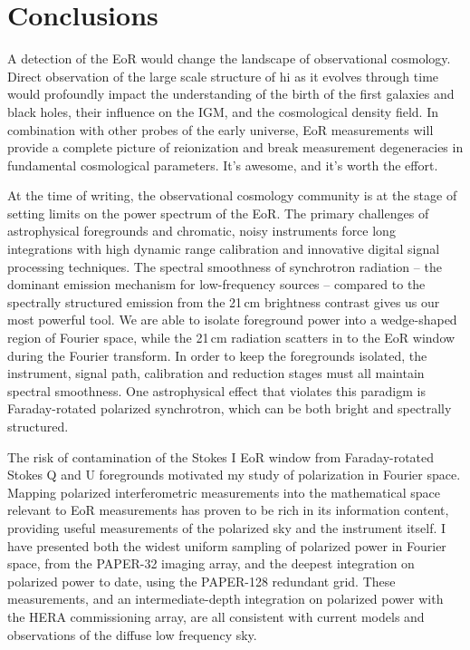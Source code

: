 \chapter{Conclusions}
\label{chapter:conc}

A detection of the EoR would change the landscape of observational cosmology. Direct observation of the large scale structure of {\sc hi} as it evolves through time would profoundly impact the understanding of the birth of the first galaxies and black holes, their influence on the IGM, and the cosmological density field. In combination with other probes of the early universe, EoR measurements will provide a complete picture of reionization and break measurement degeneracies in fundamental cosmological parameters. It's awesome, and it's worth the effort.

At the time of writing, the observational cosmology community is at the stage of setting limits on the power spectrum of the EoR. The primary challenges of astrophysical foregrounds and chromatic, noisy instruments force long integrations with high dynamic range calibration and innovative digital signal processing techniques. The spectral smoothness of synchrotron radiation -- the dominant emission mechanism for low-frequency sources -- compared to the spectrally structured emission from the 21\,cm brightness contrast gives us our most powerful tool. We are able to isolate foreground power into a wedge-shaped region of Fourier space, while the 21\,cm radiation scatters in to the EoR window during the Fourier transform. In order to keep the foregrounds isolated, the instrument, signal path, calibration and reduction stages must all maintain spectral smoothness. One astrophysical effect that violates this paradigm is Faraday-rotated polarized synchrotron, which can be both bright and spectrally structured.

The risk of contamination of the Stokes I EoR window from Faraday-rotated Stokes Q and U foregrounds motivated my study of polarization in Fourier space. Mapping polarized interferometric measurements into the mathematical space relevant to EoR measurements has proven to be rich in its information content, providing useful measurements of the polarized sky and the instrument itself. I have presented both the widest uniform sampling of polarized power in Fourier space, from the PAPER-32 imaging array, and the deepest integration on polarized power to date, using the PAPER-128 redundant grid. These measurements, and an intermediate-depth integration on polarized power with the HERA commissioning array, are all consistent with current models and observations of the diffuse low frequency sky. 

